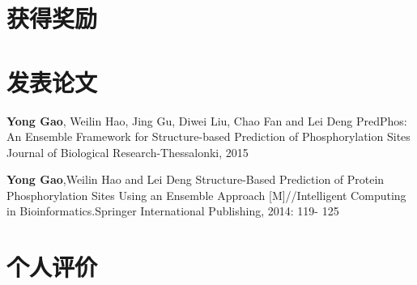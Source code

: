 \documentclass[10pt,a4paper]{moderncv}
\begin{document}
\begin{spacing}{1.01}


\section{获得奖励}


\section{发表论文}

\cventry{[1]}
{\textbf{Yong Gao}\textnormal{, Weilin Hao, Jing Gu, Diwei Liu, Chao Fan and Lei Deng}}
{PredPhos: An Ensemble Framework for Structure-based Prediction of Phosphorylation Sites}
{Journal of Biological Research-Thessalonki, 2015}
{}{}{}

\cventry{[2]}
{\textbf{Yong Gao}\textnormal{,Weilin Hao and Lei Deng}}
{Structure-Based Prediction of Protein Phosphorylation Sites Using an
Ensemble Approach}
{[M]//Intelligent Computing in Bioinformatics.Springer International Publishing, 2014: 119-
125}
{}{}{}

\section{个人评价}



\renewcommand{\listitemsymbol}{-} %
%

\end{spacing}
\end{document}
